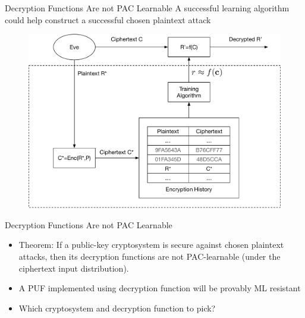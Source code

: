 \begin{frame}{Decryption Functions Are not PAC Learnable}
A successful learning algorithm could help construct a successful chosen plaintext attack
\begin{figure}
\centering
\includegraphics[width=.75\linewidth]{fig/MLasDistinguisher.pdf}
\end{figure}
\end{frame}

\begin{frame}{Decryption Functions Are not PAC Learnable}
\begin{itemize}
    \item Theorem: If a public-key cryptosystem is secure against chosen plaintext attacks, then its decryption functions are not PAC-learnable (under the ciphertext input distribution).
    \item A PUF implemented using decryption function will be provably ML resistant 
    \item Which cryptosystem and decryption function to pick?
\end{itemize}
\end{frame}

